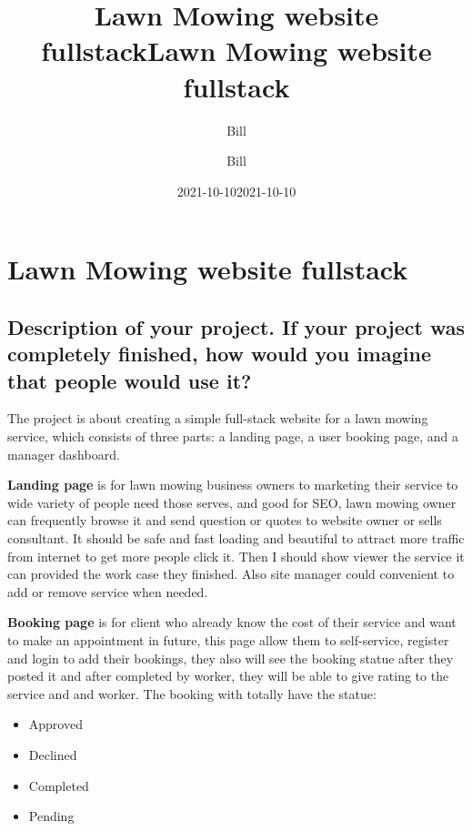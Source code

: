 \documentclass[
  paper=a4,
  ,captions=tableheading
]{scrartcl}
\title{Lawn Mowing website fullstack}
\author{Bill}
\date{2021-10-10}
\title{Lawn Mowing website fullstack}
\author{Bill}
\date{2021-10-10}
\providecommand{\tightlist}{%
  \setlength{\itemsep}{0pt}\setlength{\parskip}{0pt}}
\begin{document}




\hypertarget{lawn-mowing-website-fullstack}{%
\section{Lawn Mowing website
fullstack}\label{lawn-mowing-website-fullstack}}

\hypertarget{description-of-your-project.-if-your-project-was-completely-finished-how-would-you-imagine-that-people-would-use-it}{%
\subsection{Description of your project. If your project was completely
finished, how would you imagine that people would use
it?}\label{description-of-your-project.-if-your-project-was-completely-finished-how-would-you-imagine-that-people-would-use-it}}

The project is about creating a simple full-stack website for a lawn
mowing service, which consists of three parts: a landing page, a user
booking page, and a manager dashboard.

\textbf{Landing page} is for lawn mowing business owners to marketing
their service to wide variety of people need those serves, and good for
SEO, lawn mowing owner can frequently browse it and send question or
quotes to website owner or sells consultant. It should be safe and fast
loading and beautiful to attract more traffic from internet to get more
people click it. Then I should show viewer the service it can provided
the work case they finished. Also site manager could convenient to add
or remove service when needed.

\textbf{Booking page} is for client who already know the cost of their
service and want to make an appointment in future, this page allow them
to self-service, register and login to add their bookings, they also
will see the booking statue after they posted it and after completed by
worker, they will be able to give rating to the service and and worker.
The booking with totally have the statue:

\begin{itemize}
\tightlist
\item
  Approved
\item
  Declined
\item
  Completed
\item
  Pending
\end{itemize}
\end{document}

